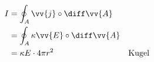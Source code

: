 \begin{boxleft}
\\
\\
\end{boxleft}\begin{boxrightshaded}
\begin{align}
I &=\oint_A\vv{j}\circ\diff\vv{A}\\
  &=\oint_A \kappa\vv{E}\circ\diff\vv{A}\\
  &=\kappa E\cdot 4\pi r^2&&\text{Kugel}\\
\end{align}
\end{boxrightshaded}

